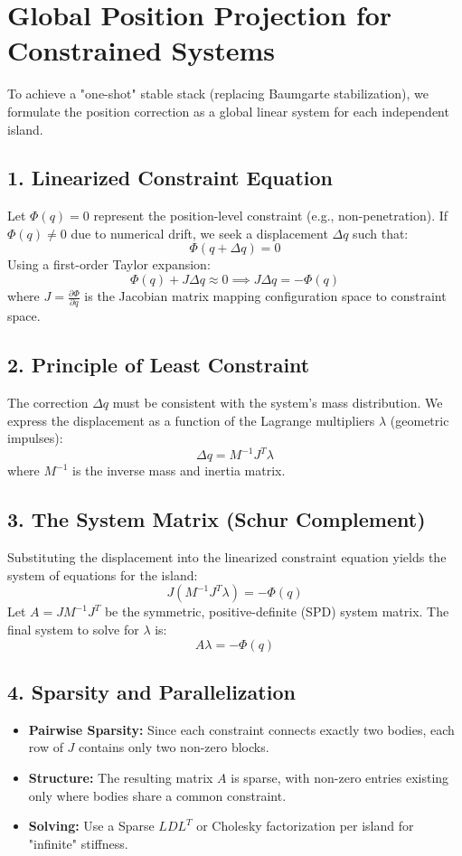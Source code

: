 \section*{Global Position Projection for Constrained Systems}

To achieve a "one-shot" stable stack (replacing Baumgarte stabilization), we formulate the position correction as a global linear system for each independent island.

\subsection*{1. Linearized Constraint Equation}
Let $\Phi(q) = 0$ represent the position-level constraint (e.g., non-penetration). If $\Phi(q) \neq 0$ due to numerical drift, we seek a displacement $\Delta q$ such that:
$$ \Phi(q + \Delta q) = 0 $$
Using a first-order Taylor expansion:
$$ \Phi(q) + J \Delta q \approx 0 \implies J \Delta q = -\Phi(q) $$
where $J = \frac{\partial \Phi}{\partial q}$ is the Jacobian matrix mapping configuration space to constraint space.

\subsection*{2. Principle of Least Constraint}
The correction $\Delta q$ must be consistent with the system's mass distribution. We express the displacement as a function of the Lagrange multipliers $\lambda$ (geometric impulses):
$$ \Delta q = M^{-1} J^T \lambda $$
where $M^{-1}$ is the inverse mass and inertia matrix.

\subsection*{3. The System Matrix (Schur Complement)}
Substituting the displacement into the linearized constraint equation yields the system of equations for the island:
$$ J (M^{-1} J^T \lambda) = -\Phi(q) $$
Let $A = J M^{-1} J^T$ be the symmetric, positive-definite (SPD) system matrix. The final system to solve for $\lambda$ is:
$$ A \lambda = -\Phi(q) $$

\subsection*{4. Sparsity and Parallelization}
\begin{itemize}
    \item \textbf{Pairwise Sparsity:} Since each constraint connects exactly two bodies, each row of $J$ contains only two non-zero blocks. 
    \item \textbf{Structure:} The resulting matrix $A$ is sparse, with non-zero entries existing only where bodies share a common constraint.
    \item \textbf{Solving:} Use a Sparse $LDL^T$ or Cholesky factorization per island for "infinite" stiffness.
\end{itemize}

